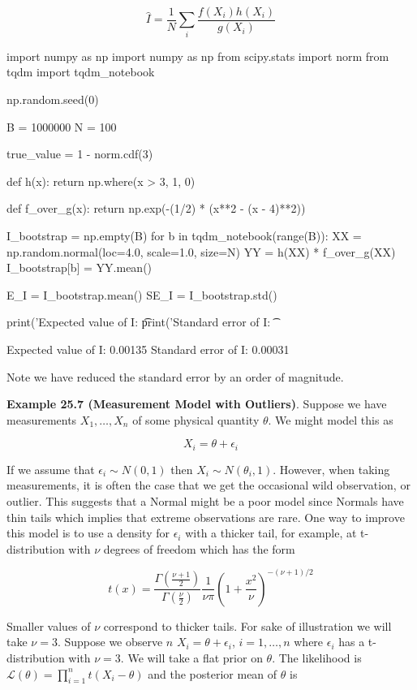 \[ \hat{I} = \frac{1}{N} \sum_i \frac{f(X_i) h(X_i)}{g(X_i)} \]

\begin{python}
import numpy as np
import numpy as np
from scipy.stats import norm
from tqdm import tqdm_notebook

np.random.seed(0)

B = 1000000
N = 100

true_value = 1 - norm.cdf(3)

def h(x):
    return np.where(x > 3, 1, 0)

def f_over_g(x):
    return np.exp(-(1/2) * (x**2 - (x - 4)**2))

I_bootstrap = np.empty(B)
for b in tqdm_notebook(range(B)):
    XX = np.random.normal(loc=4.0, scale=1.0, size=N)
    YY = h(XX) * f_over_g(XX)
    I_bootstrap[b] = YY.mean()

E_I = I_bootstrap.mean()
SE_I = I_bootstrap.std()

print('Expected value of I: \t %
print('Standard error of I: \t %
\end{python}


\begin{console}
Expected value of I:     0.00135
Standard error of I:     0.00031
\end{console}

Note we have reduced the standard error by an order of magnitude.

\textbf{Example 25.7 (Measurement Model with Outliers)}. Suppose we have
measurements \(X_1, \dots, X_n\) of some physical quantity \(\theta\).
We might model this as

\[ X_i = \theta + \epsilon_i \]

If we assume that \(\epsilon_i \sim N(0, 1)\) then
\(X_i \sim N(\theta_i, 1)\). However, when taking measurements, it is
often the case that we get the occasional wild observation, or outlier.
This suggests that a Normal might be a poor model since Normals have
thin tails which implies that extreme observations are rare. One way to
improve this model is to use a density for \(\epsilon_i\) with a thicker
tail, for example, at t-distribution with \(\nu\) degrees of freedom
which has the form

\[ t(x) = \frac{\Gamma\left( \frac{\nu + 1}{2} \right)}{\Gamma \left( \frac{\nu}{2} \right)} \frac{1}{\nu \pi} \left( 1 + \frac{x^2}{\nu} \right)^{-(\nu + 1) / 2}\]

Smaller values of \(\nu\) correspond to thicker tails. For sake of
illustration we will take \(\nu = 3\). Suppose we observe \(n\)
\(X_i = \theta + \epsilon_i\), \(i = 1, \dots, n\) where \(\epsilon_i\)
has a t-distribution with \(\nu = 3\). We will take a flat prior on
\(\theta\). The likelihood is
\(\mathcal{L}(\theta) = \prod_{i=1}^n t(X_i - \theta)\) and the
posterior mean of \(\theta\) is


